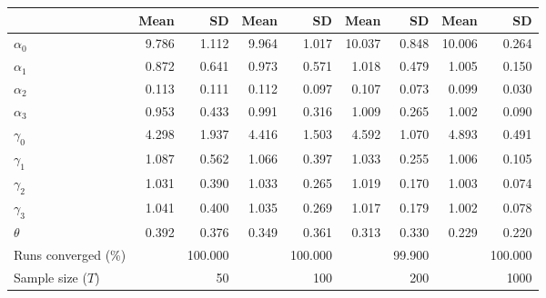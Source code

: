 
\begin{tabular}[t]{lrrrrrrrr}
\toprule
  & Mean & SD & Mean  & SD  & Mean   & SD   & Mean    & SD   \\
\midrule
$\alpha_{0}$ & 9.786 & 1.112 & 9.964 & 1.017 & 10.037 & 0.848 & 10.006 & 0.264\\
$\alpha_{1}$ & 0.872 & 0.641 & 0.973 & 0.571 & 1.018 & 0.479 & 1.005 & 0.150\\
$\alpha_{2}$ & 0.113 & 0.111 & 0.112 & 0.097 & 0.107 & 0.073 & 0.099 & 0.030\\
$\alpha_{3}$ & 0.953 & 0.433 & 0.991 & 0.316 & 1.009 & 0.265 & 1.002 & 0.090\\
$\gamma_{0}$ & 4.298 & 1.937 & 4.416 & 1.503 & 4.592 & 1.070 & 4.893 & 0.491\\
$\gamma_{1}$ & 1.087 & 0.562 & 1.066 & 0.397 & 1.033 & 0.255 & 1.006 & 0.105\\
$\gamma_{2}$ & 1.031 & 0.390 & 1.033 & 0.265 & 1.019 & 0.170 & 1.003 & 0.074\\
$\gamma_{3}$ & 1.041 & 0.400 & 1.035 & 0.269 & 1.017 & 0.179 & 1.002 & 0.078\\
$\theta$ & 0.392 & 0.376 & 0.349 & 0.361 & 0.313 & 0.330 & 0.229 & 0.220\\
Runs converged (\%) &  & 100.000 &  & 100.000 &  & 99.900 &  & 100.000\\
Sample size ($T$) &  & 50 &  & 100 &  & 200 &  & 1000\\
\bottomrule
\end{tabular}
